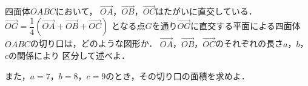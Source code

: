 \documentclass[../../main.tex]{subfiles}
\begin{document}
四面体$OABC$において，
$\overrightarrow{OA}$，$\overrightarrow{OB}$，$\overrightarrow{OC}$はたがいに直交している．
$\displaystyle\overrightarrow{OG}=\dfrac{1}{4}(\overrightarrow{OA}+\overrightarrow{OB}+\overrightarrow{OC})$
となる点$G$を通り$\overrightarrow{OG}$に直交する平面による四面体$OABC$の切り口は，どのような図形か．
$\overrightarrow{OA}$，$\overrightarrow{OB}$，$\overrightarrow{OC}$のそれぞれの長さ$a$，$b$，$c$の関係により
区分して述べよ．

また，$a=7$，$b=8$，$c=9$のとき，その切り口の面積を求めよ．
\end{document}
